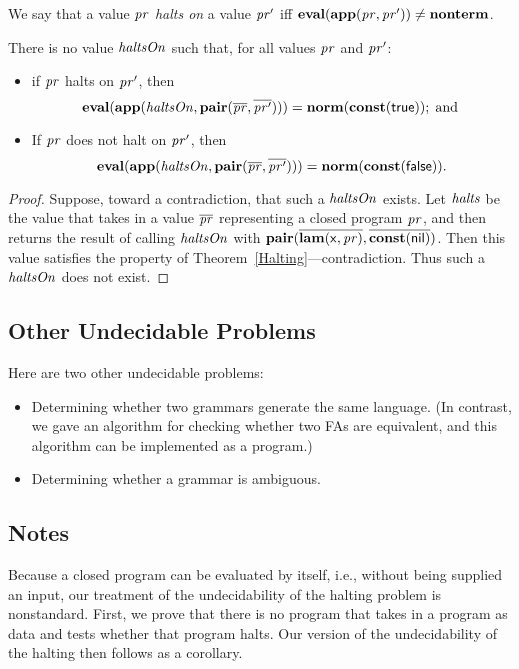 We say that a value $\mathit{pr}$ \emph{halts on} a value $\mathit{pr}'$ iff
$\mathbf{eval}(\mathbf{app}(\mathit{pr},\mathit{pr}'))\neq\mathbf{nonterm}$.

\begin{corollary}
There is no value $\mathit{haltsOn}$ such that, for all values
$\mathit{pr}$ and $\mathit{pr}'$:
\begin{itemize}
\item if $\mathit{pr}$ halts on $\mathit{pr}'$, then
  \begin{displaymath}
    \mathbf{eval}(\mathbf{app}(\mathit{haltsOn},\mathbf{pair}(\overline{\mathit{pr}},\overline{\mathit{pr}'}))) =
    \mathbf{norm}(\mathbf{const}(\mathsf{true})) ; \;\allowbreak\mbox{and}\allowbreak\;
  \end{displaymath}

\item If $\mathit{pr}$ does not halt on $\mathit{pr}'$, then
  \begin{displaymath}
    \mathbf{eval}(\mathbf{app}(\mathit{haltsOn},\mathbf{pair}(\overline{\mathit{pr}},\overline{\mathit{pr}'}))) =
    \mathbf{norm}(\mathbf{const}(\mathsf{false})) .
  \end{displaymath}
\end{itemize}
\end{corollary}

\begin{proof}
Suppose, toward a contradiction, that such a $\mathit{haltsOn}$ exists.  Let
$\mathit{halts}$ be the value that takes in a value $\overline{\mathit{pr}}$
representing a closed program $\mathit{pr}$, and then returns the result of
calling $\mathit{haltsOn}$ with
$\mathbf{pair}(\overline{\mathbf{lam}(\mathsf{x},\mathit{pr})},\overline{\mathbf{const}(\mathsf{nil})})$.
Then this value satisfies the property of
Theorem~\ref{Halting}---contradiction.  Thus such a $\mathit{haltsOn}$ does
not exist.
\end{proof}

\subsection{Other Undecidable Problems}

Here are two other undecidable problems:
\begin{itemize}
\item Determining whether two grammars generate the same language.
(In contrast, we gave an algorithm for checking whether two FAs are
equivalent, and this algorithm can be implemented as a program.)

\item Determining whether a grammar is ambiguous.
\end{itemize}

\subsection{Notes}

Because a closed program can be evaluated by itself, i.e., without
being supplied an input, our treatment of the undecidability of
the halting problem is nonstandard.  First, we prove that there is
no program that takes in a program as data and tests whether that
program halts.  Our version of the undecidability of the halting
then follows as a corollary.

